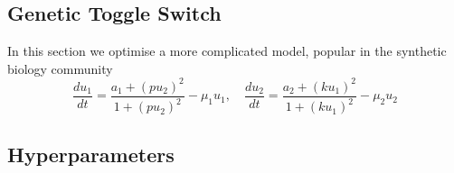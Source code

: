\subsection{Genetic Toggle Switch}
In this section we optimise a more complicated model, popular in the synthetic biology community
\begin{equation}
    \dfrac{du_1}{dt} = \dfrac{a_1 + (p u_2)^2} { 1 + (p u_2)^2 } - \mu_1 u_1, \quad
    \dfrac{du_2}{dt} = \dfrac{a_2 + (k u_1)^2} { 1 + (k u_1)^2 } - \mu_2 u_2
\end{equation}


\subsection{Hyperparameters}







